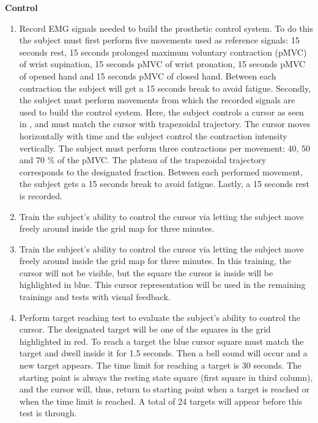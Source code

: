 \noindent\textbf{{Control}} \\
\vspace{-25pt}
\begin{enumerate}
	\item Record EMG signals needed to build the prosthetic control system. To do this the subject must first perform  five movements used as reference signals: 15 seconds rest, 15 seconds prolonged maximum voluntary contraction (pMVC) of wrist supination, 15 seconds pMVC of wrist pronation, 15 seconds pMVC of opened hand and 15 seconds pMVC of closed hand. Between each contraction the subject will get a 15 seconds break to avoid fatigue. Secondly, the subject must perform movements from which the recorded signals are used to build the control system. Here, the subject controls a cursor as seen in , and must match the cursor with trapezoidal trajectory. The cursor moves horizontally with time and the subject control the contraction intensity vertically. The subject must perform three contractions per movement: 40, 50 and 70 \% of the pMVC. The plateau of the trapezoidal trajectory corresponds to the designated fraction. Between each performed movement, the subject gets a 15 seconds break to avoid fatigue. Lastly, a 15 seconds rest is recorded. 
	\item Train the subject's ability to control the cursor via letting the subject move freely around inside the grid map for three minutes.
	\item Train the subject's ability to control the cursor via letting the subject move freely around inside the grid map for three minutes. In this training, the cursor will not be visible, but the square the cursor is inside will be highlighted in blue. This cursor representation will be used in the remaining trainings and tests with visual feedback.
	\item Perform target reaching test to evaluate the subject's ability to control the cursor. The designated target will be one of the squares in the grid highlighted in red. To reach a target the blue cursor square must match the target and dwell inside it for 1.5 seconds. Then a bell sound will occur and a new target appears. The time limit for reaching a target is 30 seconds. The starting point is always the resting state square (first square in third column), and the cursor will, thus, return to starting point when a target is reached or when the time limit is reached. A total of 24 targets will appear before this test is through.
\end{enumerate}

